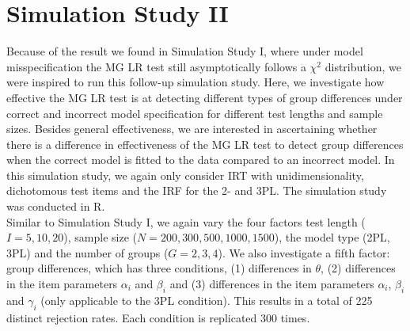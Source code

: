 \documentclass[Royal,sageapa,times,doublespace]{sagej}
\begin{document}
\section{Simulation Study II}
Because of the result we found in Simulation Study I, where under model misspecification the MG LR test still asymptotically follows a $\chi^2$ distribution, we were inspired to run this follow-up simulation study. Here, we investigate how effective the MG LR test is at detecting different types of group differences under correct and incorrect model specification for different test lengths and sample sizes. Besides general effectiveness, we are interested in ascertaining whether there is a difference in effectiveness of the MG LR test to detect group differences when the correct model is fitted to the data compared to an incorrect model. In this simulation study, we again only consider IRT with unidimensionality, dichotomous test items and the IRF for the 2- and 3PL. The simulation study was conducted in R. \\
\indent Similar to Simulation Study I, we again vary the four factors test length ($I = 5, 10, 20$), sample size ($N = 200, 300, 500, 1000, 1500$), the model type (2PL, 3PL) and the number of groups ($G = 2, 3, 4$). We also investigate a fifth factor: group differences, which has three conditions, (1) differences in $\theta$, (2) differences in the item parameters $\alpha_i$ and $\beta_i$ and (3) differences in the item parameters $\alpha_i$, $\beta_i$ and $\gamma_i$ (only applicable to the 3PL condition). This results in a total of 225 distinct rejection rates. Each condition is replicated 300 times. \\
\end{document}
